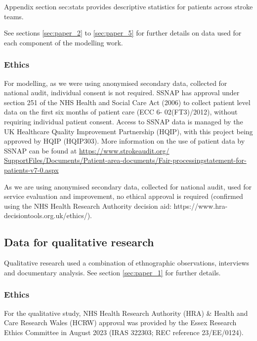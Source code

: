 Appendix section {sec:stats} provides descriptive statistics for patients across stroke teams.

See sections \ref{sec:paper_2} to \ref{sec:paper_5} for further details on data used for each component of the modelling work.



\subsubsection{Ethics}

For modelling, as we were using anonymised secondary data, collected for national audit, individual consent is not required. SSNAP has approval under section 251 of the NHS Health and Social Care Act (2006) to collect patient level data on the first six months of patient care (ECC 6- 02(FT3)/2012), without requiring individual patient consent. Access to SSNAP data is managed by the UK Healthcare Quality Improvement Partnership (HQIP), with this project being approved by HQIP (HQIP303). More information on the use of patient data by SSNAP can be found at \url{https://www.strokeaudit.org/ SupportFiles/Documents/Patient-area-documents/Fair-processingstatement-for-patients-v7-0.aspx}

As we are using anonymised secondary data, collected for national audit, used for service evaluation and improvement, no ethical approval is required (confirmed using the NHS Health Research Authority decision aid: https://www.hra-decisiontools.org.uk/ethics/).

\subsection{Data for qualitative research}

Qualitative research used a combination of ethnographic observations, interviews and documentary analysis. See section \ref{sec:paper_1} for further details.

\subsubsection{Ethics}

For the qualitative study, NHS Health Research Authority (HRA) \& Health and Care Research Wales (HCRW) approval was provided by the Essex Research Ethics Committee in August 2023 (IRAS 322303; REC reference 23/EE/0124).